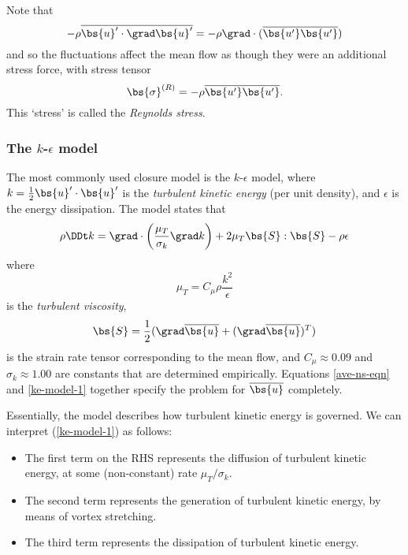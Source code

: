 Note that 
\begin{equation}
    -\rho\overline{\bs{u}'\cdot\grad\bs{u}'} = -\rho\grad\cdot(\overline{\bs{u'}\bs{u'}})
\end{equation}
and so the fluctuations affect the mean flow as though they were an additional
stress force, with stress tensor 
\begin{equation}
    \bs{\sigma}^{(R)} = -\rho \overline{\bs{u'}\bs{u'}}.
\end{equation}
This `stress' is called the \textit{Reynolds stress}.

\subsubsection{The $k$-$\epsilon$ model}

The most commonly used closure model is the $k$-$\epsilon$ model, where
$k=\frac{1}{2}\bs{u}'\cdot\bs{u}'$ is the \textit{turbulent kinetic energy} (per
unit density), and $\epsilon$ is the energy dissipation. The model states that
\begin{equation}
    \rho\DDt k
    = \grad\cdot\left(\frac{\mu_T}{\sigma_k}\grad k\right) 
    + 2 \mu_T \bs{S}:\bs{S} 
    - \rho\epsilon
    \label{ke-model-1}
\end{equation}
where 
\begin{equation}
    \mu_T = C_\mu\rho\frac{k^2}{\epsilon}
\end{equation}
is the \textit{turbulent viscosity}, 
\begin{equation}
    \bs{S} = \frac{1}{2}(\grad\overline{\bs{u}} + (\grad\overline{\bs{u}})^T)
\end{equation}
is the strain rate tensor corresponding to the mean flow, and $C_\mu \approx
0.09$ and $\sigma_k\approx1.00$ are constants that are determined empirically.
Equations \ref{ave-ns-eqn} and \ref{ke-model-1} together specify the problem for
$\overline{\bs{u}}$ completely.

Essentially, the model describes how turbulent kinetic energy is governed. We
can interpret (\ref{ke-model-1}) as follows:
\begin{itemize}
    \item The first term on the RHS represents the diffusion of turbulent
        kinetic energy, at some (non-constant) rate $\mu_T/\sigma_k$.
    \item The second term represents the generation of turbulent kinetic energy,
        by means of vortex stretching.
    \item The third term represents the dissipation of turbulent kinetic energy.
\end{itemize}

